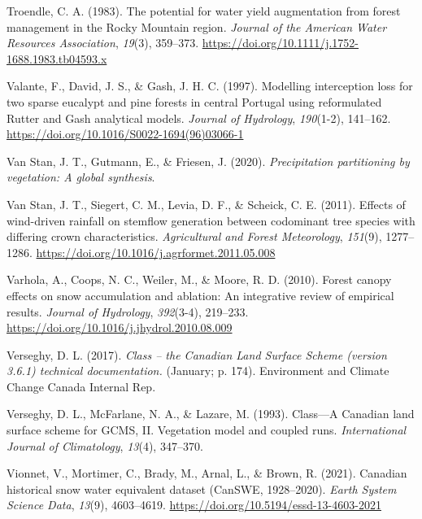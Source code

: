 \documentclass[
  letterpaper,
]{tex/uofsthesis-cs}
\newlength{\cslhangindent}
\newenvironment{CSLReferences}[2] %
 {\begin{list}{}{%
  \setlength{\itemindent}{0pt}
  \setlength{\leftmargin}{0pt}
  \setlength{\parsep}{0pt}
  \ifodd #1
   \setlength{\leftmargin}{\cslhangindent}
   \setlength{\itemindent}{-1\cslhangindent}
  \fi
  \setlength{\itemsep}{#2\baselineskip}}}
 {\end{list}}
\begin{document}
\begin{CSLReferences}{1}{0}
Troendle, C. A. (1983). The potential for water yield augmentation from
forest management in the {Rocky Mountain} region. \emph{Journal of the
American Water Resources Association}, \emph{19}(3), 359--373.
\url{https://doi.org/10.1111/j.1752-1688.1983.tb04593.x}

Valante, F., David, J. S., \& Gash, J. H. C. (1997). Modelling
interception loss for two sparse eucalypt and pine forests in central
{Portugal} using reformulated {Rutter} and {Gash} analytical models.
\emph{Journal of Hydrology}, \emph{190}(1-2), 141--162.
\url{https://doi.org/10.1016/S0022-1694(96)03066-1}

Van Stan, J. T., Gutmann, E., \& Friesen, J. (2020). \emph{Precipitation
partitioning by vegetation: {A} global synthesis}.

Van Stan, J. T., Siegert, C. M., Levia, D. F., \& Scheick, C. E. (2011).
Effects of wind-driven rainfall on stemflow generation between
codominant tree species with differing crown characteristics.
\emph{Agricultural and Forest Meteorology}, \emph{151}(9), 1277--1286.
\url{https://doi.org/10.1016/j.agrformet.2011.05.008}

Varhola, A., Coops, N. C., Weiler, M., \& Moore, R. D. (2010). Forest
canopy effects on snow accumulation and ablation: {An} integrative
review of empirical results. \emph{Journal of Hydrology},
\emph{392}(3-4), 219--233.
\url{https://doi.org/10.1016/j.jhydrol.2010.08.009}

Verseghy, D. L. (2017). \emph{Class -- the {Canadian Land Surface
Scheme} (version 3.6.1) technical documentation.} (January; p. 174).
{Environment and Climate Change Canada Internal Rep.}

Verseghy, D. L., McFarlane, N. A., \& Lazare, M. (1993). Class---{A
Canadian} land surface scheme for {GCMS}, {II}. {Vegetation} model and
coupled runs. \emph{International Journal of Climatology}, \emph{13}(4),
347--370.

Vionnet, V., Mortimer, C., Brady, M., Arnal, L., \& Brown, R. (2021).
Canadian historical snow water equivalent dataset ({CanSWE},
1928--2020). \emph{Earth System Science Data}, \emph{13}(9), 4603--4619.
\url{https://doi.org/10.5194/essd-13-4603-2021}


\end{CSLReferences}
\end{document}
